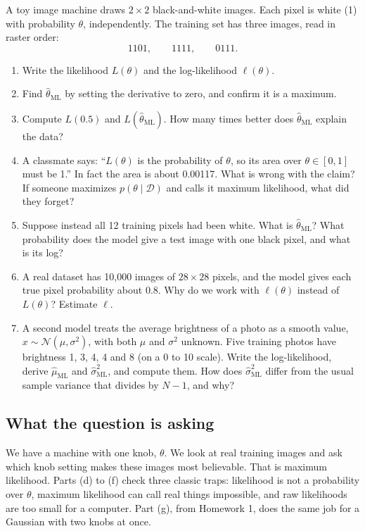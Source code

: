 \documentclass[12pt,a4paper]{article}
\begin{document}
A toy image machine draws $2\times2$ black-and-white images. Each pixel is white (1) with probability $\theta$, independently. The training set has three images, read in raster order:
\[
1101,\qquad 1111,\qquad 0111 .
\]
\begin{enumerate}[label=(\alph*)]
  \item Write the likelihood $L(\theta)$ and the log-likelihood $\ell(\theta)$.
  \item[\colorbox{yellow}{(b)}] Find $\hat\theta_{\text{ML}}$ by setting the derivative to zero, and confirm it is a maximum.
  \item Compute $L(0.5)$ and $L(\hat\theta_{\text{ML}})$. How many times better does $\hat\theta_{\text{ML}}$ explain the data?
  \item[\colorbox{yellow}{(d)}] A classmate says: ``$L(\theta)$ is the probability of $\theta$, so its area over $\theta\in[0,1]$ must be 1.'' In fact the area is about 0.00117. What is wrong with the claim? If someone maximizes $p(\theta\mid\mathcal{D})$ and calls it maximum likelihood, what did they forget?
  \item Suppose instead all 12 training pixels had been white. What is $\hat\theta_{\text{ML}}$? What probability does the model give a test image with one black pixel, and what is its log?
  \item[\colorbox{yellow}{(f)}] A real dataset has 10,000 images of $28\times28$ pixels, and the model gives each true pixel probability about 0.8. Why do we work with $\ell(\theta)$ instead of $L(\theta)$? Estimate $\ell$.
  \item[\colorbox{yellow}{(g)}] A second model treats the average brightness of a photo as a smooth value, $x\sim\mathcal{N}(\mu,\sigma^2)$, with both $\mu$ and $\sigma^2$ unknown. Five training photos have brightness 1, 3, 4, 4 and 8 (on a 0 to 10 scale). Write the log-likelihood, derive $\hat\mu_{\text{ML}}$ and $\hat\sigma^2_{\text{ML}}$, and compute them. How does $\hat\sigma^2_{\text{ML}}$ differ from the usual sample variance that divides by $N-1$, and why?
\end{enumerate}

\subsection{What the question is asking}

We have a machine with one knob, $\theta$. We look at real training images and ask which knob setting makes these images most believable. That is maximum likelihood. Parts (d) to (f) check three classic traps: likelihood is not a probability over $\theta$, maximum likelihood can call real things impossible, and raw likelihoods are too small for a computer. Part (g), from Homework 1, does the same job for a Gaussian with two knobs at once.
\end{document}
